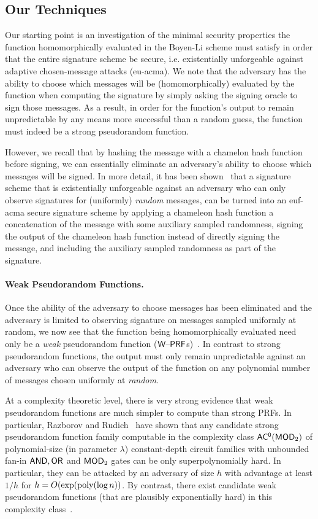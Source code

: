 \subsection{Our Techniques}
\label{sec:techniq}
Our starting point is an investigation of the minimal security properties the function homomorphically evaluated in the Boyen-Li scheme must satisfy in order that the entire signature scheme be secure, i.e. existentially unforgeable against adaptive chosen-message attacks (eu-acma). We note that the adversary has the ability to choose which messages will be (homomorphically) evaluated by the function when computing the signature by simply asking the signing oracle to sign those messages. As a result, in order for the function's output to remain unpredictable by any means more successful than a random guess, the function must indeed be a strong pseudorandom function. 

However, we recall that by hashing the message with a chamelon hash function~\cite{DBLP:conf/ndss/KrawczykR00} before signing, we can essentially eliminate an adversary's ability to choose which messages will be signed. In more detail, it has  been shown~\cite{DBLP:conf/crypto/ShamirT01} that a signature scheme that is existentially unforgeable against an adversary who can only observe signatures for (uniformly) \emph{random} messages, can be turned into an euf-acma secure signature scheme by applying a chameleon hash function a concatenation of the message with some auxiliary sampled randomness, signing the output of the chameleon hash function instead of directly signing the message, and including the auxiliary sampled randomness as part of the signature.

\paragraph{Weak Pseudorandom Functions.}
Once the ability of the adversary to choose messages has been eliminated and the adversary is limited to observing signature on messages sampled uniformly at random, we now see that the function being homomorphically evaluated need only be a \emph{weak} pseudorandom function ($\mathsf{W\text{\textendash}PRF}$s)~\cite{DBLP:conf/crypto/DamgardN02}. In contrast to strong pseudorandom functions, the output must only
remain unpredictable against an adversary who can observe the output of the function on any polynomial number of messages chosen uniformly at \emph{random}.

At a complexity theoretic level, there is very strong evidence that weak pseudorandom functions are much simpler to compute than strong PRFs. In particular, Razborov and Rudich~\cite{DBLP:conf/stoc/RazborovR94} have shown that any candidate strong pseudorandom function family computable in the complexity class $\mathsf{AC^{0}}(\mathsf{MOD}_2)$ of polynomial-size (in parameter $\lambda$) constant-depth circuit families with unbounded fan-in $\mathsf{AND},\mathsf{OR}$ and $\mathsf{MOD}_2$ gates can be only superpolynomially hard. In particular, they can be attacked by an adversary of size $h$ with advantage at least $1/h$ for $h=O(\exp(\operatorname{poly}(\log{n}))$. 
By contrast, there exist candidate weak pseudorandom functions (that are plausibly exponentially hard) in this complexity class~\cite{DBLP:conf/innovations/AkaviaBGKR14}.

